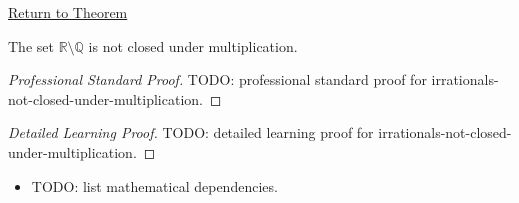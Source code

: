 \newpage
{}
\label{prf:irrationals-not-closed-under-multiplication}

\begin{remark*}[Return]
\hyperref[cor:irrationals-not-closed-under-multiplication]{Return to Theorem}
\end{remark*}

\begin{corollary*}
The set $\mathbb{R}\setminus\mathbb{Q}$ is not closed under multiplication.
\end{corollary*}

\begin{proof}[Professional Standard Proof]
\LRAProofBodyStart
TODO: professional standard proof for irrationals-not-closed-under-multiplication.
\end{proof}

\begin{proof}[Detailed Learning Proof]
\LRAProofBodyStart
TODO: detailed learning proof for irrationals-not-closed-under-multiplication.
\end{proof}

\begin{remark*}
\end{remark*}

\begin{dependencies}
\begin{itemize}
  \item TODO: list mathematical dependencies.
\end{itemize}
\end{dependencies}

\clearpage

